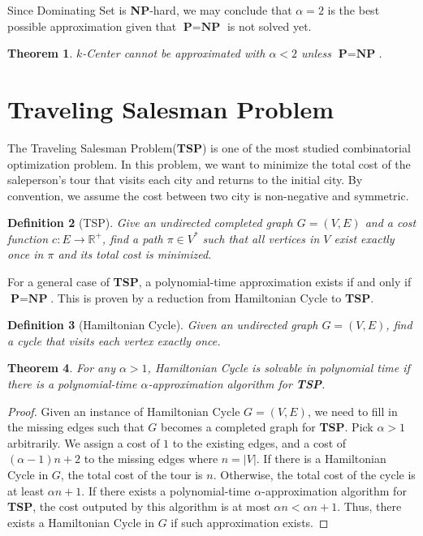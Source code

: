 \documentclass[11pt,psfig,times]{article}
\newcommand*{\PTIME}{\textbf{P}}
\newcommand*{\NP}{\textbf{NP}}
\newtheorem{theorem}{Theorem}
\newtheorem{definition}[theorem]{Definition}
\begin{document}
Since Dominating Set is \NP-hard, we may conclude that $\alpha = 2$ is the best possible approximation given that $\PTIME = \NP$ is not solved yet. 
\begin{theorem}
    $k$-Center cannot be approximated with $\alpha < 2$ unless $\PTIME = \NP$.
\end{theorem}

\section{Traveling Salesman Problem}
The Traveling Salesman Problem(\textbf{TSP}) is one of the most studied combinatorial optimization problem.
In this problem, we want to minimize the total cost of the saleperson's tour that visits each city and returns to 
the initial city. By convention, we assume the cost between two city is non-negative and symmetric.  
\begin{definition}[TSP]
    Give an undirected completed graph $G = (V, E)$ and a cost function $c: E \rightarrow \mathbb{R}^+$, find a path $\pi \in V^*$
    such that all vertices in $V$ exist exactly once in $\pi$ and its total cost is minimized.
\end{definition}
For a general case of \textbf{TSP}, a polynomial-time approximation exists if and only if $\PTIME = \NP$. This is proven 
by a reduction from Hamiltonian Cycle to \textbf{TSP}.
\begin{definition}[Hamiltonian Cycle]
    Given an undirected graph $G = (V, E)$, find a cycle that visits each vertex exactly once.
\end{definition}
\begin{theorem}
    For any $\alpha > 1$, Hamiltonian Cycle is solvable in polynomial time if there is a polynomial-time $\alpha$-approximation algorithm 
    for \textbf{TSP}.
\end{theorem}
\begin{proof}
    Given an instance of Hamiltonian Cycle $G = (V, E)$, we need to fill in the missing edges such that $G$ becomes 
    a completed graph for \textbf{TSP}. Pick $\alpha > 1$ arbitrarily. 
    We assign a cost of $1$ to the existing edges, and a cost of $(\alpha - 1) n + 2$ to the missing 
    edges where $n = |V|$. If there is a Hamiltonian Cycle in $G$, the total cost of the tour is $n$. 
    Otherwise, the total cost of the cycle is at least $\alpha n + 1$. If there exists a polynomial-time $\alpha$-approximation algorithm 
    for \textbf{TSP}, the cost outputed by this algorithm is at most $\alpha n < \alpha n + 1$. Thus, there exists a 
    Hamiltonian Cycle in $G$ if such approximation exists.  
\end{proof}
\end{document}
